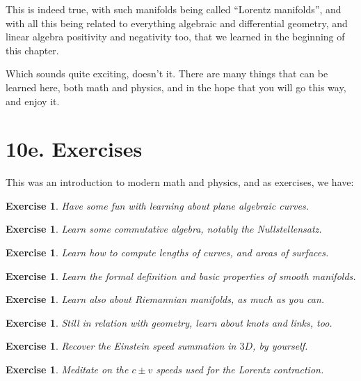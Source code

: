 \documentclass[12pt]{amsbook}
\newtheorem{exercise}[theorem]{Exercise}
\begin{document}
\bigskip

This is indeed true, with such manifolds being called ``Lorentz manifolds'', and with all this being related to everything algebraic and differential geometry, and linear algebra positivity and negativity too, that we learned in the beginning of this chapter.

\bigskip

Which sounds quite exciting, doesn't it. There are many things that can be learned here, both math and physics, and in the hope that you will go this way, and enjoy it.

\section*{10e. Exercises}

This was an introduction to modern math and physics, and as exercises, we have:

\begin{exercise}
Have some fun with learning about plane algebraic curves.
\end{exercise}

\begin{exercise}
Learn some commutative algebra, notably the Nullstellensatz.
\end{exercise}

\begin{exercise}
Learn how to compute lengths of curves, and areas of surfaces.
\end{exercise}

\begin{exercise}
Learn the formal definition and basic properties of smooth manifolds.
\end{exercise}

\begin{exercise}
Learn also about Riemannian manifolds, as much as you can.
\end{exercise}

\begin{exercise}
Still in relation with geometry, learn about knots and links, too.
\end{exercise}

\begin{exercise}
Recover the Einstein speed summation in $3D$, by yourself.
\end{exercise}

\begin{exercise}
Meditate on the $c\pm v$ speeds used for the Lorentz contraction.
\end{exercise}
\end{document}
